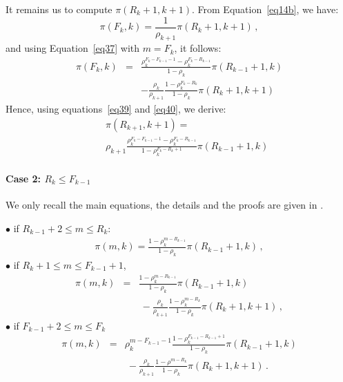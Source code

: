 \documentclass[conference]{IEEEtran}
\begin{document}
It remains us to compute $\pi(R_{k}+1, k+1)$. From Equation~\eqref{eq14b}, we have:
\begin{equation}
\pi(F_{k},k)= \frac{1}{\rho_{k+1}} \pi(R_{k}+1,k+1) \, ,
\label{eq39}
\end{equation}
and using Equation~\eqref{eq37} with $m=F_k$, it follows:
\begin{eqnarray}
\pi(F_k,k)&=& \frac{ \rho_k ^{F_k-F_{k-1}-1} -\rho_k^{F_k-R_{k-1}} } {1-\rho_k} \pi(R_{k-1}+1,k) \nonumber \\
&&- \frac{\rho_k}{\rho_{k+1}} \frac{1- \rho_k ^{F_k-R_k}} {1-\rho_k} \pi(R_{k}+1, k+1)
 \label{eq40}
\end{eqnarray}
Hence, using equations~\eqref{eq39} and \eqref{eq40}, we derive:
\begin{eqnarray}
&&\pi(R_{k+1},k+1)= \nonumber\\
&&\rho_{k+1} \frac{ \rho_k^{F_k-F_{k-1}-1}
-\rho_k^{F_k-R_{k-1}} } { 1- \rho_k^{F_k-R_{k}+1}} \pi(R_{k-1}+1,k)
\label{eq50}
\end{eqnarray}

\paragraph{Case 2: $R_{k} \leq F_{k-1}$}
We only recall the main equations, the details and the proofs are given in \cite{le2000simple}.

\noindent
$\bullet$ if  $R_{k-1}+2 \leq m \leq R_k$:
\begin{eqnarray}
\pi(m,k)=\frac{1-\rho_k^{m-R_{k-1}}}{1-\rho_k} \pi(R_{k-1}+1,k) \, ,
\label{eqB1}
\end{eqnarray}
$\bullet$ if $R_k+1 \leq m \leq F_{k-1}+1$,
\begin{eqnarray}
 \pi(m,k)&=&\frac{1-\rho_k^{m-R_{k-1} }} {1-\rho_k} \pi(R_{k-1}+1,k) \nonumber\\
&& \ -\frac{\rho_k}{\rho_{k+1}} \frac{1- \rho_k^{m-R_k}}{1-\rho_k} \pi(R_k+1,k+1) \, ,
\label{eqB2}
 \end{eqnarray}
$\bullet$ if $F_{k-1}+2 \leq m \leq F_k$
 \begin{eqnarray}
 \pi(m,k)&= & \rho_k^{m-F_{k-1}-1} \frac{1-\rho_k^{F_{k-1}-R_{k-1}+1}} {1-\rho_k} \pi(R_{k-1}+1,k) \nonumber \\
 && \ - \frac{\rho_k}{\rho_{k+1}}
\frac{1-\rho^{m-R_k}}{1-\rho_k} \pi(R_{k}+1,k+1) \, .
\label{eqB3}
 \end{eqnarray}
\end{document}
